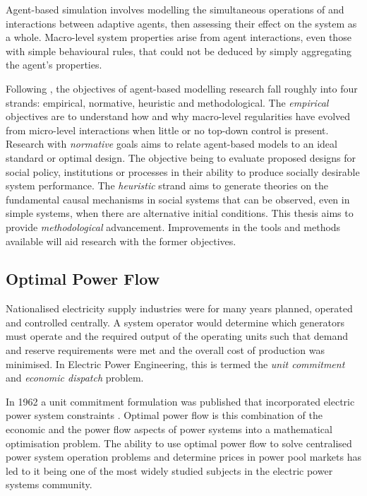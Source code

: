 Agent-based simulation involves modelling the simultaneous operations of and
interactions between adaptive agents, then assessing their effect on the system
as a whole.  Macro-level system properties arise from agent interactions, even
those with simple behavioural rules, that could not be deduced by simply
aggregating the agent's properties. %

Following , the objectives of agent-based modelling
research fall roughly into four strands: empirical, normative, heuristic and
methodological. The \textit{empirical} objectives are to understand how and why macro-level
regularities have evolved from micro-level interactions when little or no
top-down control is present.  Research with \textit{normative} goals aims
to relate agent-based models to an ideal standard or optimal design.  The objective being
to evaluate proposed designs for social policy, institutions or processes in
their ability to produce socially desirable system performance.  The
\textit{heuristic} strand aims to generate theories on the fundamental causal
mechanisms in social systems that can be observed, even in simple systems, when there are
alternative initial conditions.  This thesis aims to provide
\textit{methodological} advancement.  Improvements in the tools and methods
available will aid research with the former objectives.

\subsection{Optimal Power Flow}
\label{sec:opf}
Nationalised electricity supply industries were for many years planned,
operated and controlled centrally.  A system operator would determine which
generators must operate and the required output of the operating units such
that demand and reserve requirements were met and the overall cost of
production was minimised.  In Electric Power Engineering, this is termed the
\textit{unit commitment} and \textit{economic dispatch} problem.

In 1962 a unit commitment formulation was published that incorporated
electric power system constraints \cite{carpentier:opf}.  Optimal power
flow is this combination of the economic and the power flow aspects of power
systems into a mathematical optimisation problem.  The ability to use optimal power flow to solve centralised power system operation problems and determine prices in power
pool markets has led to it being one of the most widely studied subjects in
the electric power systems community.

